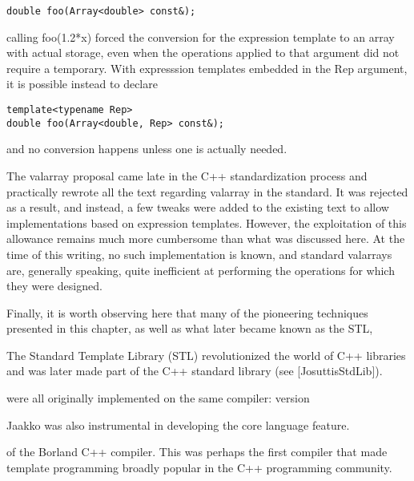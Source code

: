 \begin{lstlisting}[style=styleCXX]
double foo(Array<double> const&);
\end{lstlisting}

calling foo(1.2*x) forced the conversion for the expression template to an array with actual storage, even when the operations applied to that argument did not require a temporary. With expresssion templates embedded in the Rep argument, it is possible instead to declare

\begin{lstlisting}[style=styleCXX]
template<typename Rep>
double foo(Array<double, Rep> const&);
\end{lstlisting}

and no conversion happens unless one is actually needed.

The valarray proposal came late in the C++ standardization process and practically rewrote all the text regarding valarray in the standard. It was rejected as a result, and instead, a few tweaks were added to the existing text to allow implementations based on expression templates. However, the exploitation of this allowance remains much more cumbersome than what was discussed here. At the time of this writing, no such implementation is known, and standard valarrays are, generally speaking, quite inefficient at performing the operations for which they were designed.

Finally, it is worth observing here that many of the pioneering techniques presented in this chapter, as well as what later became known as the STL,

\begin{tcolorbox}[colback=webgreen!5!white,colframe=webgreen!75!black]
\hspace*{0.75cm}The Standard Template Library (STL) revolutionized the world of C++ libraries and was later made part of the C++ standard library (see [JosuttisStdLib]).
\end{tcolorbox}

were all originally implemented on the same compiler: version

\begin{tcolorbox}[colback=webgreen!5!white,colframe=webgreen!75!black]
\hspace*{0.75cm}Jaakko was also instrumental in developing the core language feature.
\end{tcolorbox}

of the Borland C++ compiler. This was perhaps the first compiler that made template programming broadly popular in the C++ programming community.

